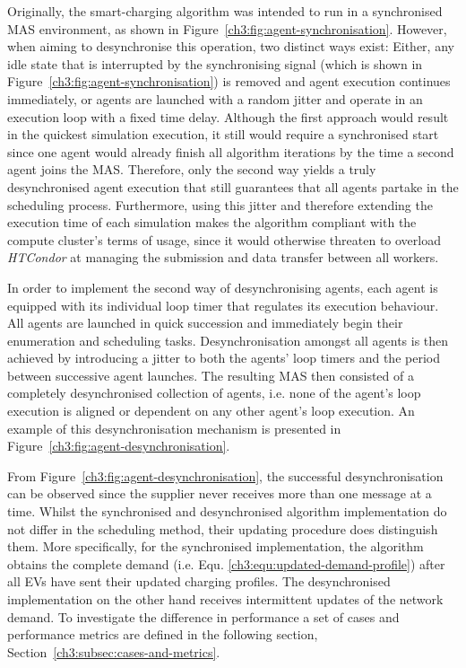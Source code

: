Originally, the smart-charging algorithm was intended to run in a synchronised MAS environment, as shown in Figure~\ref{ch3:fig:agent-synchronisation}.
However, when aiming to desynchronise this operation, two distinct ways exist:
Either, any idle state that is interrupted by the synchronising signal (which is shown in Figure~\ref{ch3:fig:agent-synchronisation}) is removed and agent execution continues immediately, or agents are launched with a random jitter and operate in an execution loop with a fixed time delay.
Although the first approach would result in the quickest simulation execution, it still would require a synchronised start since one agent would already finish all algorithm iterations by the time a second agent joins the MAS.
Therefore, only the second way yields a truly desynchronised agent execution that still guarantees that all agents partake in the scheduling process.
Furthermore, using this jitter and therefore extending the execution time of each simulation makes the algorithm compliant with the compute cluster's terms of usage, since it would otherwise threaten to overload \textit{HTCondor} at managing the submission and data transfer between all workers.

In order to implement the second way of desynchronising agents, each agent is equipped with its individual loop timer that regulates its execution behaviour.
All agents are launched in quick succession and immediately begin their enumeration and scheduling tasks.
Desynchronisation amongst all agents is then achieved by introducing a jitter to both the agents' loop timers and the period between successive agent launches.
The resulting MAS then consisted of a completely desynchronised collection of agents, i.e. none of the agent's loop execution is aligned or dependent on any other agent's loop execution.
An example of this desynchronisation mechanism is presented in Figure~\ref{ch3:fig:agent-desynchronisation}.



From Figure~\ref{ch3:fig:agent-desynchronisation}, the successful desynchronisation can be observed since the supplier never receives more than one message at a time.
Whilst the synchronised and desynchronised algorithm implementation do not differ in the scheduling method, their updating procedure does distinguish them.
More specifically, for the synchronised implementation, the algorithm obtains the complete demand (i.e. Equ. \ref{ch3:equ:updated-demand-profile}) after all EVs have sent their updated charging profiles.
The desynchronised implementation on the other hand receives intermittent updates of the network demand.
To investigate the difference in performance a set of cases and performance metrics are defined in the following section, Section~\ref{ch3:subsec:cases-and-metrics}.

